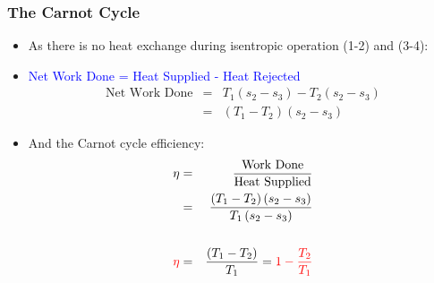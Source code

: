 \documentclass[10pt,compress]{beamer}
\begin{document}
\begin{frame}
 \frametitle{The Carnot Cycle}
    \begin{itemize} 
     \item <1-> As there is no heat exchange during isentropic operation (1-2) and (3-4): 
     \item <2-> \textcolor{blue}{Net Work Done = Heat Supplied - Heat Rejected}
      \begin{eqnarray}
       \text{Net Work Done} &=& T_{1}\left(s_{2}-s_{3}\right)-T_{2}\left(s_{2}-s_{3}\right) \nonumber \\
                            &=& \left(T_{1}-T_{2}\right)\left(s_{2}-s_{3}\right)\nonumber
      \end{eqnarray}
     \item <3-> And the Carnot cycle efficiency:\\
      \begin{eqnarray}
        \eta &=& \displaystyle\frac{\text{Work Done}}{\text{Heat Supplied}} \nonumber \\
             &=& \displaystyle\frac{\left(T_{1}-T_{2}\right)\left(s_{2}-s_{3}\right)}{T_{1}\left(s_{2}-s_{3}\right)} \nonumber \\
             & & \nonumber \\
        \textcolor{red}{\eta} &=& \displaystyle\frac{\left(T_{1}-T_{2}\right)}{T_{1}} = \textcolor{red}{1 - \displaystyle\frac{T_{2}}{T_{1}}} \nonumber
      \end{eqnarray}
    \end{itemize}
\end{frame}
\end{document}

